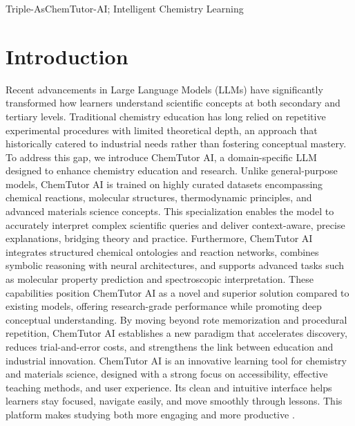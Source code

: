 \begin{teamsubmission}{Triple-As}{ChemTutor-AI; Intelligent Chemistry Learning}




\section*{Introduction}
Recent advancements in Large Language Models (LLMs) have significantly transformed how learners understand scientific concepts at both secondary and tertiary levels. Traditional chemistry education has long relied on repetitive experimental procedures with limited theoretical depth, an approach that historically catered to industrial needs rather than fostering conceptual mastery. To address this gap, we introduce ChemTutor AI, a domain-specific LLM designed to enhance chemistry education and research. Unlike general-purpose models, ChemTutor AI is trained on highly curated datasets encompassing chemical reactions, molecular structures, thermodynamic principles, and advanced materials science concepts. This specialization enables the model to accurately interpret complex scientific queries and deliver context-aware, precise explanations, bridging theory and practice. Furthermore, ChemTutor AI integrates structured chemical ontologies and reaction networks, combines symbolic reasoning with neural architectures, and supports advanced tasks such as molecular property prediction and spectroscopic interpretation. These capabilities position ChemTutor AI as a novel and superior solution compared to existing models, offering research-grade performance while promoting deep conceptual understanding. By moving beyond rote memorization and procedural repetition, ChemTutor AI establishes a new paradigm that accelerates discovery, reduces trial-and-error costs, and strengthens the link between education and industrial innovation. ChemTutor AI is an innovative learning tool for chemistry and materials science, designed with a strong focus on accessibility, effective teaching methods, and user experience. Its clean and intuitive interface helps learners stay focused, navigate easily, and move smoothly through lessons. This platform makes studying both more engaging and more productive \cite{bretz2019evidence}.


\end{teamsubmission}
